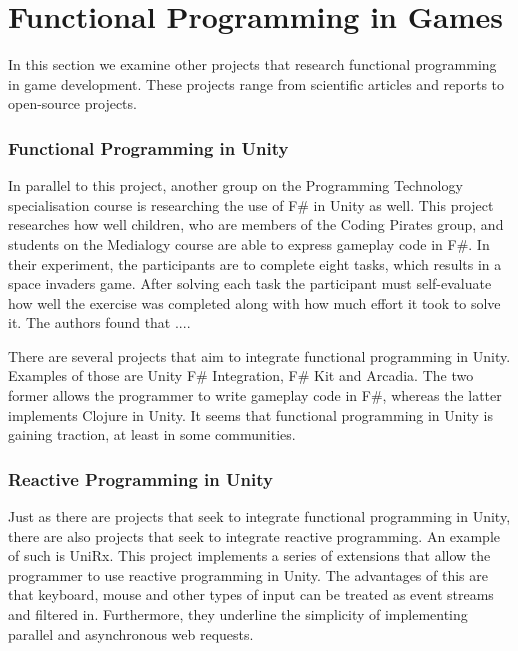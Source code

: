 \section{Functional Programming in Games}
In this section we examine other projects that research functional programming in game development. These projects range from scientific articles and reports to open-source projects.

\subsubsection{Functional Programming in Unity}
In parallel to this project, another group on the Programming Technology specialisation course is researching the use of F\# in Unity as well. This project researches how well children, who are members of the Coding Pirates group, and students on the Medialogy course are able to express gameplay code in F\#. In their experiment, the participants are to complete eight tasks, which results in a space invaders game. After solving each task the participant must self-evaluate how well the exercise was completed along with how much effort it took to solve it. The authors found that ...\cite{bolhuis2019gameplay}. 

There are several projects that aim to integrate functional programming in Unity. Examples of those are Unity F\# Integration\cite{fsharp2019plugin}, F\# Kit\cite{fsharp:kit} and Arcadia\cite{arcadia:github}. The two former allows the programmer to write gameplay code in F\#, whereas the latter implements Clojure in Unity. It seems that functional programming in Unity is gaining traction, at least in some communities.

\subsubsection{Reactive Programming in Unity}
Just as there are projects that seek to integrate functional programming in Unity, there are also projects that seek to integrate reactive programming. An example of such is UniRx\cite{unirx}. This project implements a series of extensions that allow the programmer to use reactive programming in Unity. The advantages of this are that keyboard, mouse and other types of input can be treated as event streams and filtered in. Furthermore, they underline the simplicity of implementing parallel and asynchronous web requests\cite{unirx:github}.

